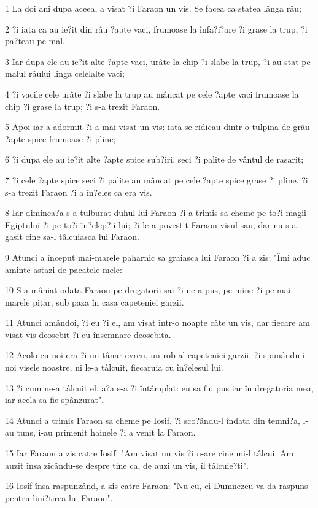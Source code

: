 \par 1 La doi ani dupa aceea, a visat ?i Faraon un vis. Se facea ca statea lânga râu;
\par 2 ?i iata ca au ie?it din râu ?apte vaci, frumoase la înfa?i?are ?i grase la trup, ?i pa?teau pe mal.
\par 3 Iar dupa ele au ie?it alte ?apte vaci, urâte la chip ?i slabe la trup, ?i au stat pe malul râului linga celelalte vaci;
\par 4 ?i vacile cele urâte ?i slabe la trup au mâncat pe cele ?apte vaci frumoase la chip ?i grase la trup; ?i s-a trezit Faraon.
\par 5 Apoi iar a adormit ?i a mai visat un vis: iata se ridicau dintr-o tulpina de grâu ?apte spice frumoase ?i pline;
\par 6 ?i dupa ele au ie?it alte ?apte spice sub?iri, seci ?i palite de vântul de rasarit;
\par 7 ?i cele ?apte spice seci ?i palite au mâncat pe cele ?apte spice grase ?i pline. ?i s-a trezit Faraon ?i a în?eles ca era vis.
\par 8 Iar diminea?a s-a tulburat duhul lui Faraon ?i a trimis sa cheme pe to?i magii Egiptului ?i pe to?i în?elep?ii lui; ?i le-a povestit Faraon visul sau, dar nu s-a gasit cine sa-l tâlcuiasca lui Faraon.
\par 9 Atunci a început mai-marele paharnic sa graiasca lui Faraon ?i a zis: "Îmi aduc aminte astazi de pacatele mele:
\par 10 S-a mâniat odata Faraon pe dregatorii sai ?i ne-a pus, pe mine ?i pe mai-marele pitar, sub paza în casa capeteniei garzii.
\par 11 Atunci amândoi, ?i eu ?i el, am visat într-o noapte câte un vis, dar fiecare am visat vis deosebit ?i cu însemnare deosebita.
\par 12 Acolo cu noi era ?i un tânar evreu, un rob al capeteniei garzii, ?i spunându-i noi visele noastre, ni le-a tâlcuit, fiecaruia cu în?elesul lui.
\par 13 ?i cum ne-a tâlcuit el, a?a s-a ?i întâmplat: eu sa fiu pus iar în dregatoria mea, iar acela sa fie spânzurat".
\par 14 Atunci a trimis Faraon sa cheme pe Iosif. ?i sco?ându-l îndata din temni?a, l-au tuns, i-au primenit hainele ?i a venit la Faraon.
\par 15 Iar Faraon a zis catre Iosif: "Am visat un vis ?i n-are cine mi-l tâlcui. Am auzit însa zicându-se despre tine ca, de auzi un vis, îl tâlcuie?ti".
\par 16 Iosif însa raspunzând, a zis catre Faraon: "Nu eu, ci Dumnezeu va da raspuns pentru lini?tirea lui Faraon".
